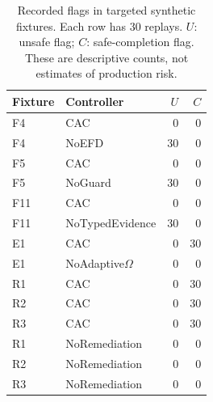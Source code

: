 \begin{table}[t]
\centering\small
\caption{Recorded flags in targeted synthetic fixtures. Each row has 30 replays. $U$: unsafe flag; $C$: safe-completion flag. These are descriptive counts, not estimates of production risk.}
\label{tab:evaluation-schema}
\begin{tabular}{@{}llrr@{}}\toprule
Fixture & Controller & $U$ & $C$ \\\midrule
F4 & CAC & 0 & 0 \\
F4 & NoEFD & 30 & 0 \\
F5 & CAC & 0 & 0 \\
F5 & NoGuard & 30 & 0 \\
F11 & CAC & 0 & 0 \\
F11 & NoTypedEvidence & 30 & 0 \\
E1 & CAC & 0 & 30 \\
E1 & NoAdaptive$\Omega$ & 0 & 0 \\
R1 & CAC & 0 & 30 \\
R2 & CAC & 0 & 30 \\
R3 & CAC & 0 & 30 \\
R1 & NoRemediation & 0 & 0 \\
R2 & NoRemediation & 0 & 0 \\
R3 & NoRemediation & 0 & 0 \\
\bottomrule\end{tabular}
\end{table}
